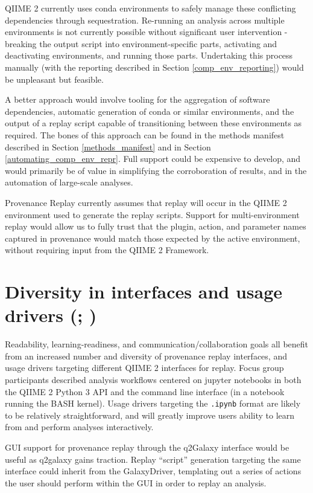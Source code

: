 QIIME 2 currently uses conda environments
to safely manage these conflicting dependencies through sequestration.
Re-running an analysis across multiple environments is not currently possible
without significant user intervention - breaking the output script into
environment-specific parts, activating and deactivating environments, and
running those parts. Undertaking this process manually (with the reporting
described in Section \ref{comp_env_reporting}) would be unpleasant but feasible.

A better approach would involve tooling for the aggregation of software
dependencies, automatic generation of conda or similar environments, and the
output of a replay script capable of transitioning between these environments as
required. The bones of this approach can be found in the methods manifest
described in Section \ref{methods_manifest} and in Section \ref{automating_comp_env_repr}.
Full support could be expensive to develop, and would primarily be of value in
simplifying the corroboration of results, and in the automation of large-scale
analyses. 

Provenance Replay currently assumes that replay will occur in the QIIME 2
environment used to generate the replay scripts. Support for multi-environment
replay would allow us to fully trust that the plugin, action, and parameter
names captured in provenance would match those expected by the active
environment, without requiring input from the QIIME 2 Framework.

\section{Diversity in interfaces and usage drivers (\cite[Issue 65]{keefe_issues_2021}; \cite[Issue 79]{keefe_issues_2021})}

Readability, learning-readiness, and communication/collaboration goals all
benefit from an increased number and diversity of provenance replay interfaces,
and usage drivers targeting different QIIME 2 interfaces for replay. Focus group
participants described analysis workflows centered on jupyter notebooks in both
the QIIME 2 Python 3 API and the command line interface (in a notebook running
the BASH kernel). Usage drivers targeting the \texttt{.ipynb} format are likely to be
relatively straightforward, and will greatly improve users ability to learn from
and perform analyses interactively.

GUI support for provenance replay through the q2Galaxy interface would be useful
as q2galaxy gains traction. Replay “script” generation targeting the same
interface could inherit from the GalaxyDriver, templating out a series of
actions the user should perform within the GUI in order to replay an analysis.

